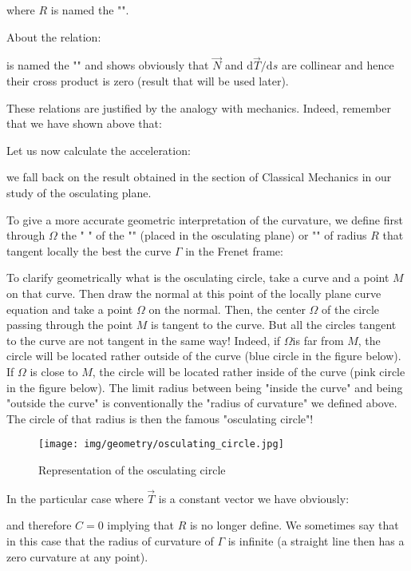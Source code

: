 {	where $R$ is named the "\label{curvature radius}".
	
	About the relation:
	
	is named the "\label{first Frenet formula}" and shows obviously that $\vec{N}$ and $\mathrm{d}\vec{T}/\mathrm{d}s$ are collinear and hence their cross product is zero (result that will be used later).
	
	These relations are justified by the analogy with mechanics. Indeed, remember that we have shown above that:
	
	
	Let us now calculate the acceleration:
	
	we fall back on the result obtained in the section of Classical Mechanics in our study of the osculating plane.
	
	To give a more accurate geometric interpretation of the curvature, we define first through $\Omega$ the " \label{center of curvature}" of the "" (placed in the osculating plane) or "" of radius $R$ that tangent locally the best the curve $\Gamma$ in the Frenet frame:
	
	To clarify geometrically what is the osculating circle, take a curve and a point $M$ on that curve. Then draw the normal at this point of the locally plane curve equation and take a point $\Omega$ on the normal. Then, the center $\Omega$ of the circle passing through the point $M$ is tangent to the curve. But all the circles tangent to the curve are not tangent in the same way! Indeed, if $\Omega $is far from $M$, the circle will be located rather outside of the curve (blue circle in the figure below). If $\Omega$ is close to $M$, the circle will be located rather inside of the curve (pink circle in the figure below). The limit radius between being "inside the curve" and being "outside the curve" is conventionally the "radius of curvature" we defined above. The circle of that radius is then the famous "osculating circle"!
	\begin{figure}[H]
		\centering
		\texttt{[image: img/geometry/osculating\_circle.jpg]}
		\caption{Representation of the osculating circle}
	\end{figure}
	In the particular case where $\vec{T}$ is a constant vector we have obviously:
	
	and therefore $C=0$ implying that $R$ is no longer define. We sometimes say that in this case that the radius of curvature  of $\Gamma$ is infinite (a straight line then has a zero curvature at any point).
	
}

